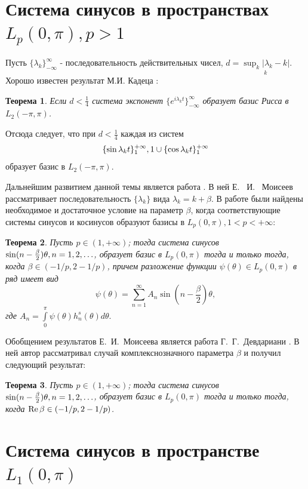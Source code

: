 ﻿\documentclass[oneside, final, 14pt]{extreport}
\newtheorem{theorem}{Теорема}
\begin{document}
\section{Система синусов в пространствах $L_p(0, \pi), p > 1$}

Пусть $\{\lambda_k\}_{-\infty}^{\infty}$ - последовательность действительных чисел, 
$d = \underset{k}{\sup_k|\lambda_k - k| }$.
Хорошо известен результат М.И. Кадеца \cite{kadec}:

\begin{theorem}
Если $ d < \frac{1}{4}$ система экспонент $\{e^{i\lambda_k t}\}_{-\infty}^{\infty}$ 
образует базис Рисса в $L_2(-\pi, \pi)$. 
\end{theorem}

Отсюда следует, что при $d < \frac{1}{4}$ каждая из систем 
$$
	\{\sin\lambda_kt\}_1^{+\infty}, \\
	1 \cup \{\cos\lambda_kt\}_1^{+\infty}
$$
образует базис в $L_2(-\pi, \pi)$.

Дальнейшим развитием данной темы является работа \cite{moiseev-dan}.
В ней Е. ~И. ~Моисеев  рассматривает последовательность $\{\lambda_k\}$ вида $\lambda_k = k + \beta$.
В работе были найдены необходимое и достаточное условие на параметр $\beta$, 
когда соответствующие системы синусов и косинусов образуют базисы в $L_p(0, \pi), 1 < p < +\infty$: 

\begin{theorem}
	Пусть $p \in (1, +\infty)$; тогда система синусов $\sin(n - \frac{\beta}{2})\theta, n = 1, 2, \ldots$, 
	образует базис в $L_p(0, \pi)$ тогда и только тогда, 
	когда $\beta \in (-1/p, 2 - 1/p)$, причем разложение функции $\psi(\theta) \in L_p(0, \pi)$
	в ряд имеет вид
	$$
		\psi(\theta) = \sum\limits_{n = 1}^{\infty}A_{n}\sin(n - \frac{\beta}{2})\theta,
	$$
	где $A_n = \int\limits_0^{\pi}\psi(\theta)h_n^s(\theta)d\theta.$
\end{theorem}

Обобщением результатов Е.~И.~Моисеева является работа Г.~Г.~Девдариани \cite{devdariani}.
В ней автор рассматривал случай комплекснозначного параметра $\beta$ и получил следующий результат:
\begin{theorem}
	Пусть $p \in (1, +\infty)$; тогда система синусов $\sin(n - \frac{\beta}{2})\theta, n = 1, 2, \ldots$, 
	образует базис в $L_p(0, \pi)$ тогда и только тогда, 
	когда $\operatorname{Re}{\beta} \in (-1/p, 2 - 1/p)$.
\end{theorem}

\section{Система синусов в пространстве $L_1(0, \pi)$}
\end{document}
